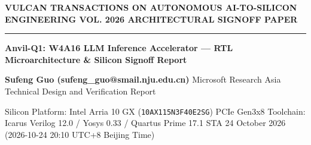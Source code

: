\documentclass[11pt,a4paper]{article}
\begin{document}
{\scriptsize\sffamily\textcolor{vulcan}{\textbf{VULCAN TRANSACTIONS ON AUTONOMOUS AI-TO-SILICON ENGINEERING \hfill VOL. 2026 \textperiodcentered{} ARCHITECTURAL SIGNOFF PAPER}}\par}

\vspace{1pt}\textcolor{vulcan}{\rule{\textwidth}{1.2pt}}\vspace{4pt}

\begin{center}

{\sffamily\LARGE\bfseries Anvil-Q1: W4A16 LLM Inference Accelerator — RTL Microarchitecture \& Silicon Signoff Report\par}\vspace{3pt}

{\small\sffamily\textbf{Sufeng Guo (\allowbreak{}sufeng\_\allowbreak{}guo@smail.nju.edu.cn)\allowbreak{}} \textperiodcentered{} Microsoft Research Asia \textperiodcentered{} Technical Design and Verification Report\par}\vspace{1pt}

{\scriptsize\sffamily\textcolor{black!75}{Silicon Platform: Intel Arria 10 GX (\texttt{10AX115N3F40E2SG}) PCIe Gen3x8 \textperiodcentered{} Toolchain: Icarus Verilog 12.0 / Yosys 0.33 / Quartus Prime 17.1 STA \textperiodcentered{} 24 October 2026 (\allowbreak{}2026-10-24 20:10 UTC+\allowbreak{}8 Beijing Time)\allowbreak{}}\par}

\end{center}\vspace{2pt}
\end{document}
